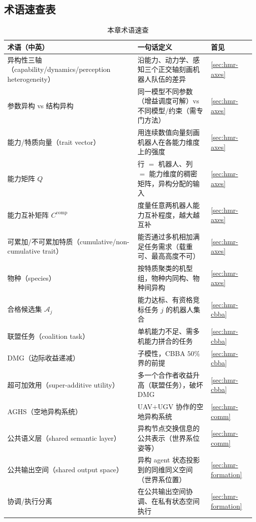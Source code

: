 \subsection*{术语速查表}
\begin{table}[H]\centering\footnotesize
\caption{本章术语速查}
\label{tab:hmr-glossary}
\begin{tabular}{p{4.6cm}p{6.4cm}p{1.0cm}}
\toprule
术语（中英） & 一句话定义 & 首见 \\
\midrule
异构性三轴（capability/dynamics/perception heterogeneity） & 沿能力、动力学、感知三个正交轴刻画机器人队伍的差异 & \cref{sec:hmr-axes} \\
参数异构 vs 结构异构 & 同一模型不同参数（增益调度可解）vs 不同模型/约束（需专门方法） & \cref{sec:hmr-axes} \\
能力/特质向量（trait vector） & 用连续数值向量刻画机器人在各能力维度上的强度 & \cref{sec:hmr-axes} \\
能力矩阵 $Q$ & 行 $=$ 机器人、列 $=$ 能力维度的稠密矩阵，异构分配的输入 & \cref{sec:hmr-axes} \\
能力互补矩阵 $C^{\mathrm{comp}}$ & 度量任意两机器人能力互补程度，越大越互补 & \cref{sec:hmr-axes} \\
可累加/不可累加特质（cumulative/non-cumulative trait） & 能否通过多机相加满足任务需求（载重可、最高高度不可） & \cref{sec:hmr-axes} \\
物种（species） & 按特质聚类的机型组，物种内同构、物种间异构 & \cref{sec:hmr-axes} \\
合格候选集 $\mathcal{A}_j$ & 能力达标、有资格竞标任务 $j$ 的机器人集合 & \cref{sec:hmr-cbba} \\
联盟任务（coalition task） & 单机能力不足、需多机能力拼合的任务 & \cref{sec:hmr-cbba} \\
DMG（边际收益递减） & 子模性，CBBA $50\%$ 界的前提 & \cref{sec:hmr-cbba} \\
超可加效用（super-additive utility） & 多一个合作者收益升高（联盟任务），破坏 DMG & \cref{sec:hmr-cbba} \\
AGHS（空地异构系统） & UAV$+$UGV 协作的空地异构系统 & \cref{sec:hmr-comm} \\
公共语义层（shared semantic layer） & 异构节点交换信息的公共表示（世界系位姿等） & \cref{sec:hmr-comm} \\
公共输出空间（shared output space） & 异构 agent 状态投影到的同维同义空间（世界系位置） & \cref{sec:hmr-formation} \\
协调/执行分离 & 在公共输出空间协调、在私有状态空间执行 & \cref{sec:hmr-formation} \\

\end{tabular}
\end{table}
